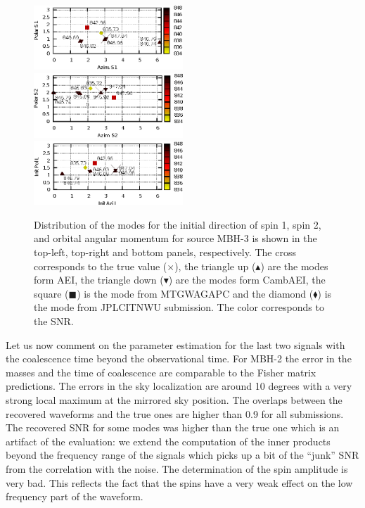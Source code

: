 \documentclass{iopart}
\begin{document}
\begin{figure}
\includegraphics[width=0.5\textwidth, clip=true, viewport=0 0 198 83 ]{DirS1_srcMC2_SNR.eps}
\includegraphics[width=0.5\textwidth, clip=true, viewport=0 0 198 83 ]{DirS2_srcMC2_SNR.eps}\\
\center \includegraphics[width=0.5\textwidth, clip=true, viewport=0 0 198 83 ]{DirL_srcMC2_SNR.eps}
\caption{Distribution of the modes for the initial direction of spin 1, spin 2, and orbital angular momentum for source MBH-3 is shown in the top-left, top-right and bottom panels, respectively. The cross corresponds to the true value ($\times$), the triangle up ($\blacktriangle$) are the modes form AEI, the triangle down ($\blacktriangledown$) are the modes form CambAEI, the square ($\blacksquare$) is the mode from MTGWAGAPC and the diamond ($\blacklozenge$) is the mode from JPLCITNWU submission. The color corresponds to the SNR.
\label{fig:SMBH_spinLdeg}}
\end{figure}


Let us now comment on the parameter estimation for the last two signals with the coalescence time beyond the observational time. For MBH-2 the error in the masses and the time of coalescence are comparable to the Fisher matrix predictions. 
The errors in the sky localization are around 10 degrees with a very strong local maximum at the mirrored 
sky position. The overlaps between the recovered waveforms and the true ones are higher than 0.9 for all submissions.
The recovered SNR for some modes was higher than the true one which is an artifact of the evaluation: 
we extend the computation of the inner products beyond the frequency range of the signals which picks up a bit of the 
``junk'' SNR from the correlation with the noise. 
%
The determination of the spin amplitude is very bad. This reflects the fact that the spins have a very weak effect on the low frequency part of the waveform. 
\end{document}
